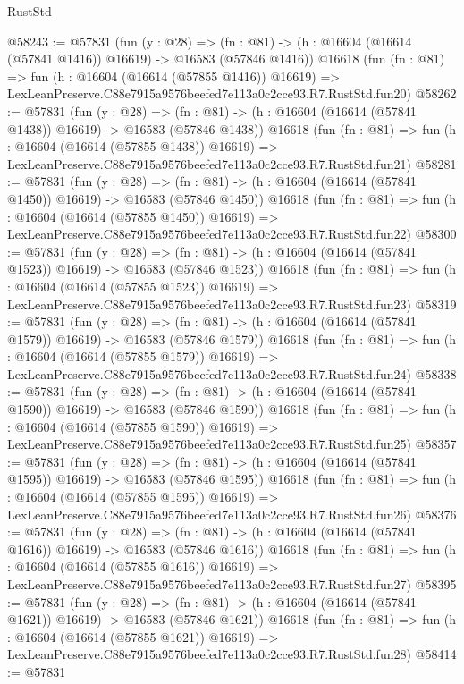 \begin{lexlean}{RustStd}
\begin{coremodule}
@58243 := @57831
    (fun (y : @28) =>
    (fn : @81) -> (h : @16604 (@16614 (@57841 @1416)) @16619) -> @16583 (@57846 @1416))
    @16618
    (fun (fn : @81) =>
    fun (h : @16604 (@16614 (@57855 @1416)) @16619) =>
    LexLeanPreserve.C88e7915a9576beefed7e113a0c2cce93.R7.RustStd.fun20)
@58262 := @57831
    (fun (y : @28) =>
    (fn : @81) -> (h : @16604 (@16614 (@57841 @1438)) @16619) -> @16583 (@57846 @1438))
    @16618
    (fun (fn : @81) =>
    fun (h : @16604 (@16614 (@57855 @1438)) @16619) =>
    LexLeanPreserve.C88e7915a9576beefed7e113a0c2cce93.R7.RustStd.fun21)
@58281 := @57831
    (fun (y : @28) =>
    (fn : @81) -> (h : @16604 (@16614 (@57841 @1450)) @16619) -> @16583 (@57846 @1450))
    @16618
    (fun (fn : @81) =>
    fun (h : @16604 (@16614 (@57855 @1450)) @16619) =>
    LexLeanPreserve.C88e7915a9576beefed7e113a0c2cce93.R7.RustStd.fun22)
@58300 := @57831
    (fun (y : @28) =>
    (fn : @81) -> (h : @16604 (@16614 (@57841 @1523)) @16619) -> @16583 (@57846 @1523))
    @16618
    (fun (fn : @81) =>
    fun (h : @16604 (@16614 (@57855 @1523)) @16619) =>
    LexLeanPreserve.C88e7915a9576beefed7e113a0c2cce93.R7.RustStd.fun23)
@58319 := @57831
    (fun (y : @28) =>
    (fn : @81) -> (h : @16604 (@16614 (@57841 @1579)) @16619) -> @16583 (@57846 @1579))
    @16618
    (fun (fn : @81) =>
    fun (h : @16604 (@16614 (@57855 @1579)) @16619) =>
    LexLeanPreserve.C88e7915a9576beefed7e113a0c2cce93.R7.RustStd.fun24)
@58338 := @57831
    (fun (y : @28) =>
    (fn : @81) -> (h : @16604 (@16614 (@57841 @1590)) @16619) -> @16583 (@57846 @1590))
    @16618
    (fun (fn : @81) =>
    fun (h : @16604 (@16614 (@57855 @1590)) @16619) =>
    LexLeanPreserve.C88e7915a9576beefed7e113a0c2cce93.R7.RustStd.fun25)
@58357 := @57831
    (fun (y : @28) =>
    (fn : @81) -> (h : @16604 (@16614 (@57841 @1595)) @16619) -> @16583 (@57846 @1595))
    @16618
    (fun (fn : @81) =>
    fun (h : @16604 (@16614 (@57855 @1595)) @16619) =>
    LexLeanPreserve.C88e7915a9576beefed7e113a0c2cce93.R7.RustStd.fun26)
@58376 := @57831
    (fun (y : @28) =>
    (fn : @81) -> (h : @16604 (@16614 (@57841 @1616)) @16619) -> @16583 (@57846 @1616))
    @16618
    (fun (fn : @81) =>
    fun (h : @16604 (@16614 (@57855 @1616)) @16619) =>
    LexLeanPreserve.C88e7915a9576beefed7e113a0c2cce93.R7.RustStd.fun27)
@58395 := @57831
    (fun (y : @28) =>
    (fn : @81) -> (h : @16604 (@16614 (@57841 @1621)) @16619) -> @16583 (@57846 @1621))
    @16618
    (fun (fn : @81) =>
    fun (h : @16604 (@16614 (@57855 @1621)) @16619) =>
    LexLeanPreserve.C88e7915a9576beefed7e113a0c2cce93.R7.RustStd.fun28)
@58414 := @57831

\end{coremodule}
\end{lexlean}
